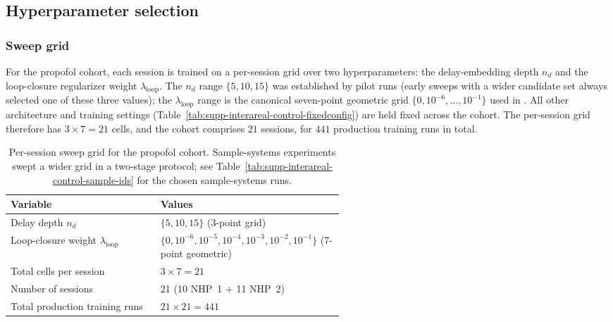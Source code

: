 \subsection{Hyperparameter selection}\label{supp:interareal-control-hyperparam}

\subsubsection{Sweep grid}\label{supp:interareal-control-sweepgrid}

For the propofol cohort, each session is trained on a per-session grid over two hyperparameters: the delay-embedding depth $n_{d}$ and the loop-closure regularizer weight $\lambda_{\mathrm{loop}}$. The $n_{d}$ range $\{5,10,15\}$ was established by pilot runs (early sweeps with a wider candidate set always selected one of these three values); the $\lambda_{\mathrm{loop}}$ range is the canonical seven-point geometric grid $\{0,10^{-6},\ldots,10^{-1}\}$ used in \cite{Eisen2025-wt}. All other architecture and training settings (Table~\ref{tab:supp-interareal-control-fixedconfig}) are held fixed across the cohort. The per-session grid therefore has $3\times 7=21$ cells, and the cohort comprises $21$ sessions, for $441$ production training runs in total.

\begin{table}[h!]
\centering
\small
\caption[Per-session sweep grid]{Per-session sweep grid for the propofol cohort. Sample-systems experiments swept a wider grid in a two-stage protocol; see Table~\ref{tab:supp-interareal-control-sample-ids} for the chosen sample-systems runs.}
\label{tab:supp-interareal-control-sweepgrid}
\begin{tabular}{lp{0.55\linewidth}}
\toprule
Variable & Values \\
\midrule
Delay depth $n_{d}$                             & $\{5,10,15\}$ (3-point grid) \\
Loop-closure weight $\lambda_{\mathrm{loop}}$   & $\{0, 10^{-6}, 10^{-5}, 10^{-4}, 10^{-3}, 10^{-2}, 10^{-1}\}$ (7-point geometric) \\
Total cells per session                          & $3\times 7=21$ \\
Number of sessions                              & 21 (10 NHP~1 + 11 NHP~2) \\
Total production training runs                  & $21\times 21=441$ \\
\bottomrule
\end{tabular}
\end{table}


